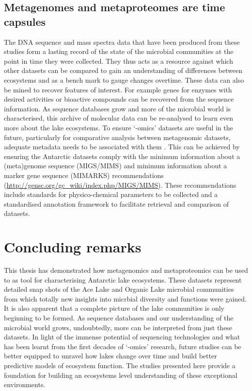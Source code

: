 \subsection{Metagenomes and metaproteomes are time capsules}
The \textsc{DNA} sequence and mass spectra data that have been produced from these studies form a lasting record of the state of the microbial communities at the point in time they were collected.
They thus acts as a resource against which other datasets can be compared to gain an understanding of differences between ecosystems and as a bench mark to gauge changes overtime.
These data can also be mined to recover features of interest.
For example genes for enzymes with desired activities or bioactive compounds can be recovered from the sequence information.
As sequence databases grow and more of the microbial world is characterised, this archive of molecular data can be re-analysed to learn even more about the lake ecosystems.
To ensure `-omics' datasets are useful in the future, particularly for comparative analysis between metagenomic datasets, adequate metadata needs to be associated with them \cite{Raes2007}.
This can be achieved by ensuring the Antarctic datasets comply with the minimum information about a (meta)genome sequence (MIGS/MIMS) \cite{Field2007} and minimum information about a marker gene sequence (MIMARKS) \cite{Yilmaz2011} recommendations  
(\url{http://gensc.org/gc_wiki/index.php/MIGS/MIMS}).
These recommendations include standards for physico-chemical parameters to be collected and a standardised annotation framework to facilitate retrieval and comparison of datasets.

%

\section{Concluding remarks}
This thesis has demonstrated how metagenomics and metaproteomics can be used to as tool for characterising Antarctic lake ecosystems.
These datasets represent detailed snap shots of the Ace Lake and Organic Lake microbial communities from which totally new insights into micrbial diversity and functions were gained.
It is also apparent that a complete picture of the lake communities is only beginning to be formed.
As sequence databases and our understanding of the microbial world grows, undoubtedly, more can be interpreted from just these datasets.
In light of the immense potential of sequencing technologies and what has been learnt from the first decades of `-omics' research, future studies can be better equipped to unravel how lakes change over time and build better predictive models of ecosystem function.  
The studies presented here provide a foundation for building an ecosystems level understanding of these exceptional environments.
